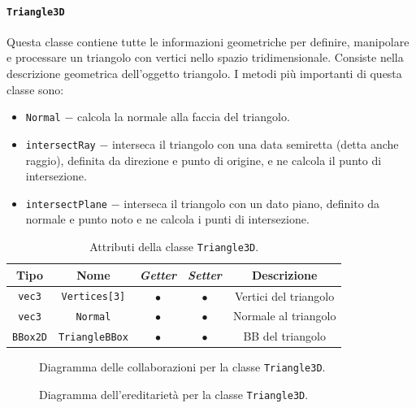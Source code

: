 \paragraph{\texttt{Triangle3D}}
Questa classe contiene tutte le informazioni geometriche per definire, manipolare e processare un triangolo con vertici nello spazio tridimensionale. Consiste nella descrizione geometrica dell'oggetto triangolo. I metodi più importanti di questa classe sono:
\begin{itemize}
	\item \texttt{Normal} $-$ calcola la normale alla faccia del triangolo.
	\item \texttt{intersectRay} $-$ interseca il triangolo con una data semiretta (detta anche raggio), definita da direzione e punto di origine, e ne calcola il punto di intersezione.
	\item \texttt{intersectPlane} $-$ interseca il triangolo con un dato piano, definito da normale e punto noto e ne calcola i punti di intersezione.
\end{itemize}
\begin{table}[h!]
	\centering
	\begin{tabular}{|c|c|c|c|c|}
		\hline 
		\textbf{Tipo} & \textbf{Nome} & \textit{\textbf{Getter}} & \textit{\textbf{Setter}} & \textbf{Descrizione} \\ \hline 
		\texttt{vec3} & \texttt{Vertices[3]} & $\bullet$ & $\bullet$ & Vertici del triangolo \\ \hline 
		\texttt{vec3} & \texttt{Normal} & $\bullet$ & $\bullet$ & Normale al triangolo \\ \hline 
		\texttt{BBox2D} & \texttt{TriangleBBox} & $\bullet$ & $\bullet$ & \ac{BB} del triangolo \\ \hline
	\end{tabular}
	\caption{Attributi della classe \texttt{Triangle3D}.}
\end{table}
%
\begin{figure}
	\centering
	\caption{Diagramma delle collaborazioni per la classe \texttt{Triangle3D}.}
\end{figure}
%
\begin{figure}
	\centering
	\caption{Diagramma dell'ereditarietà per la classe \texttt{Triangle3D}.}
\end{figure}
%
